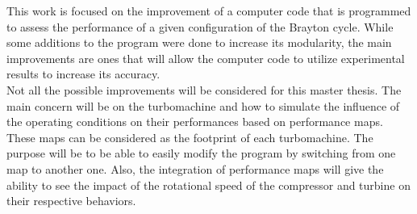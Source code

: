 This work is focused on the improvement of a computer code that is programmed to assess the performance of a given configuration of the Brayton cycle. While some additions to the program were done to increase its modularity, the main improvements are ones that will allow the computer code to utilize experimental results to increase its accuracy. \\

Not all the possible improvements will be considered for this master thesis. The main concern will be on the turbomachine and how to simulate the influence of the operating conditions on their performances based on performance maps. These maps can be considered as the footprint of each turbomachine.  The purpose will be to be able to easily modify the program by switching from one map to another one. Also, the integration of performance maps will give the ability to see the impact of the rotational speed of the compressor and turbine on their respective behaviors.
